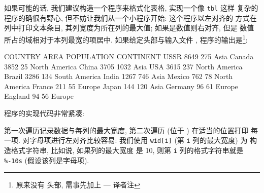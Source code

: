 如果可能的话, 我们建议构造一个程序来格式化表格, 实现一个像 \verb'tbl' 这样
复杂的程序的确很有野心, 但不妨让我们从一个小程序开始: 这个程序以左对齐的
方式在列中打印文本条目, 其列宽度为所在列的最大值; 如果是数值则右对齐, 但是 
数值所占的域相对于本列最宽的项居中. 如果给定头部与输入文件
, 程序的输出是\footnote{ 原来没有
头部, 需事先加上 --- 译者注}:
\begin{awkcode}
    COUNTRY   AREA   POPULATION   CONTINENT    
    USSR      8649       275      Asia         
    Canada    3852        25      North America
    China     3705      1032      Asia
    USA       3615       237      North America
    Brazil    3286       134      South America
    India     1267       746      Asia
    Mexico     762        78      North America
    France     211        55      Europe
    Japan      144       120      Asia
    Germany     96        61      Europe
    England     94        56      Europe
\end{awkcode}

程序的实现代码非常紧凑:
第一次遍历记录数据与每列的最大宽度, 第二次遍历 (位于 \END) 在适当的位置打印
每一项. 对字母项进行左对齐比较容易: 我们使用 \verb'wid[i]' (第 
\verb'i' 列的最大宽度) 为 \printf 构造格式字符串, 比如说, 如果列的最大宽度
是 10, 则第 \verb'i' 列的格式字符串就是 \verb'%-10s' (假设该列是字母项).

